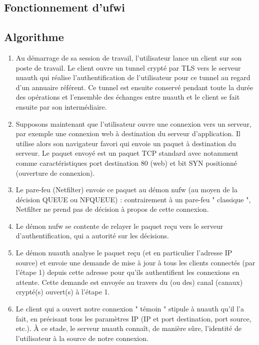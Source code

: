 \documentclass[12pt]{report}
\begin{document}
\begin{itemize}
\chapter{Fonctionnement d'ufwi}
\section{Algorithme}

\begin{enumerate}
  \item Au démarrage de sa session de travail, l’utilisateur lance un client sur son poste de travail. Le client ouvre un tunnel crypté par TLS vers le serveur nuauth qui réalise l’authentification de l’utilisateur pour ce tunnel au regard d’un annuaire référent. Ce tunnel est ensuite conservé pendant toute la durée des opérations et l’ensemble des échanges entre nuauth et le client se fait ensuite par son intermédiaire.
  \\
  \item Supposons maintenant que l’utilisateur ouvre une connexion vers un serveur, par exemple une connexion web à destination du serveur d’application. Il utilise alors son navigateur favori qui envoie un paquet à destination du serveur. Le paquet envoyé est un paquet TCP standard avec notamment comme caractéristiques port destination 80 (web) et bit SYN positionné (ouverture de connexion).
  \\
  \item Le pare-feu (Netfilter) envoie ce paquet au démon nufw (au moyen de la décision QUEUE ou NFQUEUE) : contrairement à un pare-feu " classique ", Netfilter ne prend pas de décision à propos de cette connexion.
  \\
  \item Le démon nufw se contente de relayer le paquet reçu vers le serveur d’authentification, qui a autorité sur les décisions.
  \\
  \item Le démon nuauth analyse le paquet reçu (et en particulier l’adresse IP source) et envoie une demande de mise à jour à tous les clients connectés (par l’étape 1) depuis cette adresse pour qu’ils authentifient les connexions en attente. Cette demande est envoyée au travers du (ou des) canal (canaux) crypté(s) ouvert(s) à l’étape 1.
  \\
  \item Le client qui a ouvert notre connexion " témoin " stipule à nuauth qu’il l’a fait, en précisant tous les paramètres IP (IP et port destination, port source, etc.). À ce stade, le serveur nuauth connaît, de manière sûre, l’identité de l’utilisateur à la source de notre connexion.

\end{enumerate}
\end{itemize}
\end{document}
